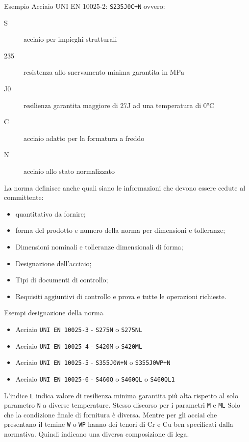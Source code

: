 \begin{example}{Esempio}
Acciaio UNI EN 10025-2: \texttt{S235J0C+N} ovvero:
\begin{description}
\item[S] acciaio per impieghi strutturali
\item[235] resistenza allo snervamento minima garantita in $\unit{\MPa}$
\item[J0] resilienza garantita maggiore di $27\unit{\J}$ ad una temperatura di $0\unit{\celsius}$
\item[C] acciaio adatto per la formatura a freddo
\item[N] acciaio allo stato normalizzato
\end{description}
\end{example}

La norma definisce anche quali siano le informazioni che devono essere cedute al committente:
\begin{itemize}
\item quantitativo da fornire;
\item forma del prodotto e numero della norma per dimensioni e tolleranze;
\item Dimensioni nominali e tolleranze dimensionali di forma;
\item Designazione dell'acciaio;
\item Tipi di documenti di controllo;
\item Requisiti aggiuntivi di controllo e prova e tutte le operazioni richieste.
\end{itemize}

\begin{example}{Esempi designazione della norma}
\begin{itemize}
\item Acciaio \texttt{UNI EN 10025-3} - \texttt{S275N} o \texttt{S275NL}
\item Acciaio \texttt{UNI EN 10025-4} - \texttt{S420M} o \texttt{S420ML}
\item Acciaio \texttt{UNI EN 10025-5} - \texttt{S355J0W+N} o \texttt{S355J0WP+N}
\item Acciaio \texttt{UNI EN 10025-6} - \texttt{S460Q} o \texttt{S460QL} o \texttt{S460QL1}
\end{itemize}
\end{example}
L'indice \texttt{L} indica valore di resilienza minima garantita più alta rispetto al solo parametro \texttt{N} a diverse temperature.
Stesso discorso per i parametri \texttt{M} e \texttt{ML} Solo che la condizione finale di fornitura è diversa.
Mentre per gli acciai che presentano il temine \texttt{W} o \texttt{WP} hanno dei tenori di Cr e Cu ben specificati dalla normativa. Quindi indicano una diversa composizione di lega.

